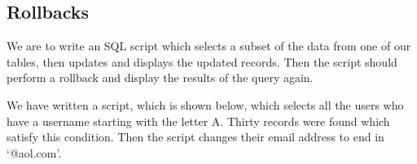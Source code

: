 \subsection{Rollbacks}

We are to write an SQL script which selects a subset of the data from one of our tables, then updates and displays the updated records. Then the script should perform a rollback and display the results of the query again.

We have written a script, which is shown below, which selects all the users who have a username starting with the letter A. Thirty records were found which satisfy this condition. Then the script changes their email address to end in `@aol.com'.

